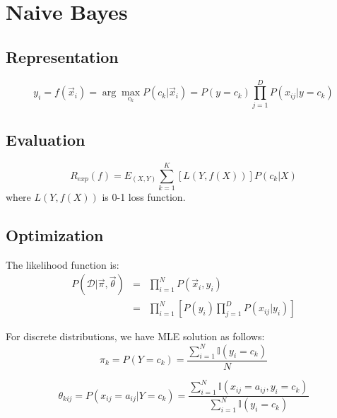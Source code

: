 \chapter{Naive Bayes}
\label{chap:Naive-Bayes}


\section{Representation}
\begin{equation}
y_i=f(\vec{x}_i)=\arg\max\limits_{c_k}{P(c_k|\vec{x}_i)}=P(y=c_k)\prod_{j=1}^D P(x_{ij}|y=c_k)
\end{equation}


\section{Evaluation}
\begin{equation}
R_{exp}(f)=E_{(X,Y)}\sum\limits_{k=1}^K\left[L\left(Y,f(X)\right)\right]P(c_k|X)
\end{equation}
where $L\left(Y,f(X)\right)$ is 0-1 loss function.


\section{Optimization}

The likelihood function is:
\begin{eqnarray*}
P(\mathcal{D} | \vec{\pi}, \vec{\theta}) & = & \prod_{i=1}^N P(\vec{x}_i, y_i) \\
      & = & \prod_{i=1}^N\left[P(y_i)\prod_{j=1}^D P(x_{ij} | y_i)\right]
\end{eqnarray*}

For discrete distributions, we have MLE solution as follows:
\begin{equation}
\pi_k = P(Y=c_k) = \frac{\sum_{i=1}^N \mathbb{I}(y_i=c_k)}{N}
\end{equation}

\begin{equation}
\theta_{kij} = P(x_{ij}=a_{ij} | Y=c_k) = \dfrac{\sum_{i=1}^N \mathbb{I}(x_{ij}=a_{ij}, y_i=c_k)}{\sum_{i=1}^N \mathbb{I}(y_i=c_k)}
\end{equation} 
